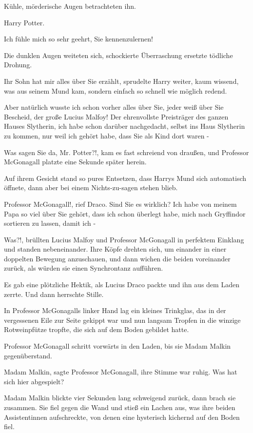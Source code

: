 Kühle, mörderische Augen betrachteten ihn.

\glqq{}Harry Potter.\grqq{}

\glqq{}Ich fühle mich so sehr geehrt, Sie kennenzulernen!\grqq{}

Die dunklen Augen weiteten sich, schockierte Überraschung ersetzte tödliche
Drohung.

\glqq{}Ihr Sohn hat mir alles über Sie erzählt\grqq{}, sprudelte Harry weiter,
kaum wissend, was aus seinem Mund kam, sondern einfach so schnell wie möglich
redend.

\glqq{}Aber natürlich wusste ich schon vorher alles über Sie, jeder weiß über Sie
Bescheid, der große Lucius Malfoy! Der ehrenvollste Preisträger des ganzen
Hauses Slytherin, ich habe schon darüber nachgedacht, selbst ins Haus Slytherin
zu kommen, nur weil ich gehört habe, dass Sie als Kind dort waren -\grqq{}

\glqq{}Was sagen Sie da, Mr. Potter?!\grqq{}, kam es fast schreiend von draußen,
und Professor McGonagall platzte eine Sekunde später herein.

Auf ihrem Gesicht stand so pures Entsetzen, dass Harrys Mund sich automatisch
öffnete, dann aber bei einem Nichts-zu-sagen stehen blieb.

\glqq{}Professor McGonagall!\grqq{}, rief Draco. \glqq{}Sind Sie es wirklich? Ich
habe von meinem Papa so viel über Sie gehört, dass ich schon überlegt habe,
mich nach Gryffindor sortieren zu lassen, damit ich -\grqq{}

\glqq{}Was?!,\grqq{} brüllten Lucius Malfoy und Professor McGonagall in perfektem
Einklang und standen nebeneinander. Ihre Köpfe drehten sich, um einander in
einer doppelten Bewegung anzuschauen, und dann wichen die beiden voreinander
zurück, als würden sie einen Synchrontanz aufführen.

Es gab eine plötzliche Hektik, als Lucius Draco packte und ihn aus dem Laden
zerrte. Und dann herrschte Stille.

In Professor McGonagalls linker Hand lag ein kleines Trinkglas, das in der
vergessenen Eile zur Seite gekippt war und nun langsam Tropfen in die winzige
Rotweinpfütze tropfte, die sich auf dem Boden gebildet hatte.

Professor McGonagall schritt vorwärts in den Laden, bis sie Madam Malkin
gegenüberstand.

\glqq{}Madam Malkin\grqq{}, sagte Professor McGonagall, ihre Stimme war ruhig.
\glqq{}Was hat sich hier abgespielt?\grqq{}

Madam Malkin blickte vier Sekunden lang schweigend zurück, dann brach sie
zusammen. Sie fiel gegen die Wand und stieß ein Lachen aus, was ihre beiden
Assistentinnen aufschreckte, von denen eine hysterisch kichernd auf den Boden
fiel.

